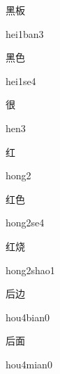 \begin{multicols*}{2}
\begin{verbete}{黑板}
\begin{pronuncia}{hei1ban3}
\end{pronuncia}
\end{verbete}

\begin{verbete}[hei1se4]{黑色}
\begin{pronuncia}{hei1se4}
\end{pronuncia}
\end{verbete}

\begin{verbete}[hen3]{很}
\begin{pronuncia}{hen3}
\end{pronuncia}
\end{verbete}

\begin{verbete}[hong2]{红}
\begin{pronuncia}{hong2}
\end{pronuncia}
\end{verbete}

\begin{verbete}[hong2se4]{红色}
\begin{pronuncia}{hong2se4}
\end{pronuncia}
\end{verbete}

\begin{verbete}{红烧}
\begin{pronuncia}{hong2shao1}
\end{pronuncia}
\end{verbete}

\begin{verbete}{后边}
\begin{pronuncia}{hou4bian0}
\end{pronuncia}
\end{verbete}

\begin{verbete}{后面}
\begin{pronuncia}{hou4mian0}
\end{pronuncia}
\end{verbete}


\end{multicols*}
